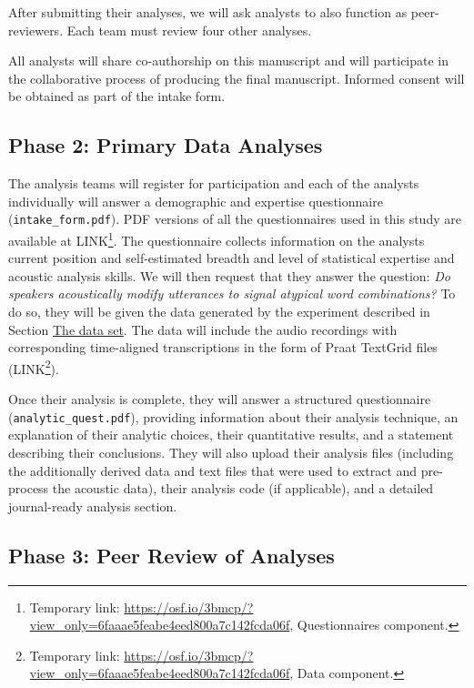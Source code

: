\documentclass[Review,times,sageh]{sagej}
\begin{document}
After submitting their analyses, we will ask analysts to also function
as peer-reviewers. Each team must review four other analyses.

All analysts will share co-authorship on this manuscript and will
participate in the collaborative process of producing the final
manuscript. Informed consent will be obtained as part of the intake
form.

\subsection{Phase 2: Primary Data
Analyses}\label{phase-2-primary-data-analyses}

The analysis teams will register for participation and each of the
analysts individually will answer a demographic and expertise
questionnaire (\texttt{intake\_form.pdf}). PDF versions of all the
questionnaires used in this study are available at LINK\footnote{Temporary
  link:
  \url{https://osf.io/3bmcp/?view_only=6faaae5feabe4eed800a7c142fcda06f},
  Questionnaires component.}. The questionnaire collects information on
the analysts current position and self-estimated breadth and level of
statistical expertise and acoustic analysis skills. We will then request
that they answer the question: \emph{Do speakers acoustically modify
utterances to signal atypical word combinations?} To do so, they will be
given the data generated by the experiment described in Section
\protect\hyperlink{s:dataset}{The data set}. The data will include the
audio recordings with corresponding time-aligned transcriptions in the
form of Praat TextGrid files (LINK\footnote{Temporary link:
  \url{https://osf.io/3bmcp/?view_only=6faaae5feabe4eed800a7c142fcda06f},
  Data component.}).

Once their analysis is complete, they will answer a structured
questionnaire (\texttt{analytic\_quest.pdf}), providing information
about their analysis technique, an explanation of their analytic
choices, their quantitative results, and a statement describing their
conclusions. They will also upload their analysis files (including the
additionally derived data and text files that were used to extract and
pre-process the acoustic data), their analysis code (if applicable), and
a detailed journal-ready analysis section.

\subsection{Phase 3: Peer Review of
Analyses}\label{phase-3-peer-review-of-analyses}
\end{document}
